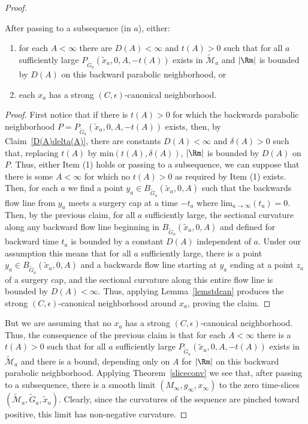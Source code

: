 \begin{proof}
\begin{claim}
\label{claim:parabolic-neighborhood-or-canonical-neighborhood} After passing to a subsequence (in $a$), either:
\begin{enumerate}
\item[(1)]
for each $A<\infty$ there are $D(A)<\infty$ and $t(A)>0$ such that for all $a$
sufficiently large $P_{\widetilde G_a}(\tilde x_a,0,A,-t(A))$ exists in
$\widetilde {\mathcal M}_a$ and $|\Rm|$ is bounded by $D(A)$ on this
backward parabolic neighborhood, or
\item[(2)] each $x_a$ has a strong
$(C,\epsilon)$-canonical neighborhood.
\end{enumerate}
\end{claim}


\begin{proof}
First notice that if there is $t(A)>0$ for which the backwards parabolic neighborhood
$P=P_{\widetilde G_a}(\tilde x_a,0,A,-t(A))$ exists,
then, by Claim~\ref{D(A)delta(A)},
there are constants $D(A)<\infty$ and $\delta(A)>0$ such that, replacing $t(A)$ by $\mathrm{min}(t(A),\delta(A))$,
 $|\Rm|$ is bounded by $D(A)$ on $P$.
Thus, either Item (1) holds or
passing to a subsequence, we can suppose that there is some $A<\infty$ for which no $t(A)>0$ as
required by Item (1) exists.
Then,  for each $a$ we find a point
$y_a\in B_{\widetilde G_a}(\tilde x_a,0,A)$ such that the backwards
flow line from $y_a$ meets a surgery cap at a time $-t_a$ where
$\mathrm{lim}_{a\rightarrow \infty}(t_a)=0$. Then, by the previous claim, for all $a$ sufficiently large, the
sectional curvature along any backward flow line beginning in $B_{\widetilde G_a}(\widetilde x_a,0,A)$
and defined for backward time $t_a$ is bounded by
a constant $D(A)$ independent of $a$.  Under our assumption this
means that for all $a$ sufficiently large, there is a point $y_a\in
B_{\widetilde G_a}(\tilde x_a,0,A)$ and a backwards flow line
starting at $y_a$ ending at a point $z_a$ of a surgery cap, and the
sectional curvature along this entire flow line is bounded by $D(A)<\infty$. Thus,
applying Lemma~\ref{lemstdcan} produces the strong
$(C,\epsilon)$-canonical neighborhood around $x_a$, proving the claim.
\end{proof}


But we are assuming that no $x_a$ has a strong $(C,\epsilon)$-canonical
neighborhood. Thus, the consequence of the previous claim is that for each
$A<\infty$ there is a $t(A)>0$ such that for all $a$ sufficiently large
$P_{\widetilde G_a}(\tilde x_a,0,A,-t(A))$ exists in $\widetilde {\mathcal
M}_a$ and there is a bound, depending only on $A$ for $|\Rm|$ on
this backward parabolic neighborhood. Applying Theorem~\ref{sliceconv} we see that, after passing to a
subsequence, there is a smooth limit $(M_\infty,g_\infty,x_\infty)$ to the zero
time-slices $(\widetilde{\mathcal M}_a,\widetilde G_a,\tilde x_a)$.
Clearly, since the curvatures of the sequence are pinched toward positive, this
limit has non-negative curvature.


\end{proof}
